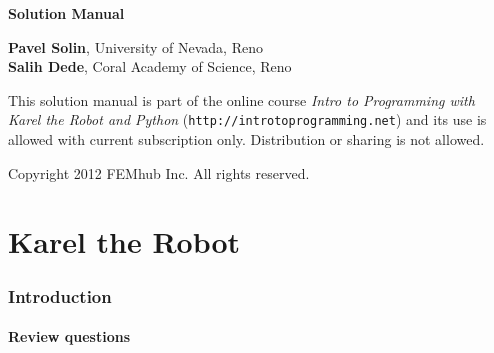 \documentclass[article,A4,12pt]{llncs}
\newif\iffullversion
\begin{document}
\begin{center}
\vspace{2.8cm}
{\huge \bf Solution Manual}
\end{center}
\vbox{}
\begin{center}
\iffullversion
\else
\vspace{2mm}
\centerline{\huge \color{red}{PREVIEW}}
\fi
\vfill
{\large
{\bf Pavel Solin}, University of Nevada, Reno\\
{\bf Salih Dede}, Coral Academy of Science, Reno
}
\end{center}
\newpage
\vbox{}
\vfill
\begin{center}
{\large
This solution manual is part of the online course 
{\em Intro to Programming with Karel the Robot and Python} 
({\tt http://introtoprogramming.net}) and its use is allowed 
with current subscription only. Distribution or sharing is not allowed. \\
}
\vfill

Copyright 2012 FEMhub Inc. All rights reserved.
\end{center}




\section*{}
\small

\normalsize

\newpage
\setcounter{tocdepth}{2}
\tableofcontents

\newpage

\pagestyle{plain}
\setcounter{page}{1}


\part{Karel the Robot}

\section{Introduction}

\subsection{Review questions}
\end{document}

